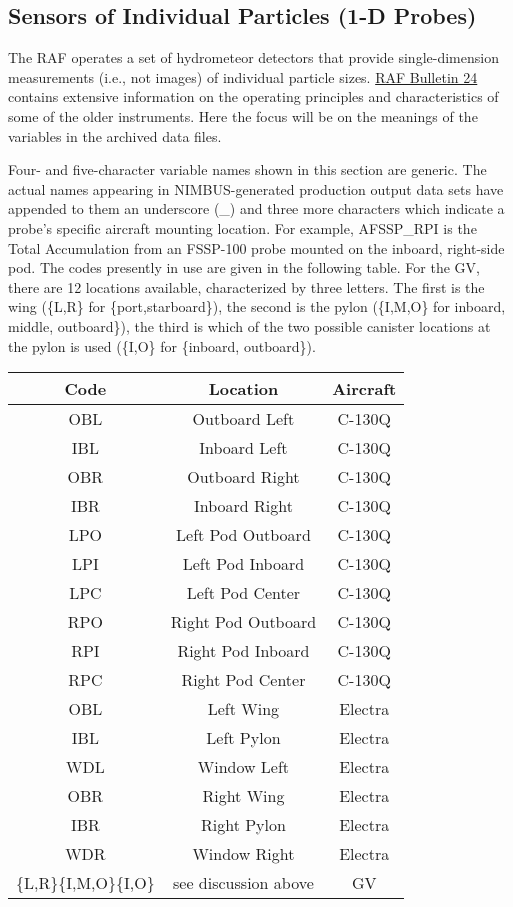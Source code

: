 \subsection{Sensors of Individual Particles (1-D Probes)}

The RAF operates a set of hydrometeor detectors
that provide single-dimension measurements (i.e., not images) of individual
particle sizes. \href{http://www.eol.ucar.edu/raf/Bulletins/bulletin24.html}{RAF Bulletin 24}
contains extensive information on the operating principles and characteristics
of some of the older instruments. Here the focus will be on the meanings
of the variables in the archived data files.

Four- and five-character variable names
shown in this section are generic. The actual names appearing in NIMBUS-generated
production output data sets have appended to them an underscore (\_)
and three more characters which indicate a probe's specific aircraft
mounting location. For example, AFSSP\_RPI is the Total Accumulation
from an FSSP-100 probe mounted on the inboard, right-side pod. The
codes presently in use are given in the following table. For the GV,
there are 12 locations available, characterized by three letters.
The first is the wing (\{L,R\} for \{port,starboard\}), the second
is the pylon (\{I,M,O\} for inboard, middle, outboard\}), the third
is which of the two possible canister locations at the pylon is used
(\{I,O\} for \{inboard, outboard\}).

\noindent \begin{center}
\begin{tabular}{|c|c|c|}
\hline 
\textbf{Code} & \textbf{Location} & \textbf{Aircraft}\tabularnewline
\hline 
\hline 
OBL  & Outboard Left  & C-130Q \tabularnewline
\hline 
IBL  & Inboard Left  & C-130Q \tabularnewline
\hline 
OBR  & Outboard Right  & C-130Q \tabularnewline
\hline 
IBR  & Inboard Right  & C-130Q \tabularnewline
\hline 
LPO  & Left Pod Outboard  & C-130Q \tabularnewline
\hline 
LPI  & Left Pod Inboard  & C-130Q \tabularnewline
\hline 
LPC  & Left Pod Center  & C-130Q \tabularnewline
\hline 
RPO  & Right Pod Outboard  & C-130Q \tabularnewline
\hline 
RPI  & Right Pod Inboard  & C-130Q \tabularnewline
\hline 
RPC  & Right Pod Center  & C-130Q \tabularnewline
\hline 
OBL  & Left Wing  & Electra \tabularnewline
\hline 
IBL  & Left Pylon  & Electra \tabularnewline
\hline 
WDL  & Window Left  & Electra \tabularnewline
\hline 
OBR  & Right Wing  & Electra \tabularnewline
\hline 
IBR  & Right Pylon  & Electra \tabularnewline
\hline 
WDR  & Window Right  & Electra \tabularnewline
\hline 
\{L,R\}\{I,M,O\}\{I,O\} & see discussion above & GV\tabularnewline
\hline 
\end{tabular}
\par\end{center}

